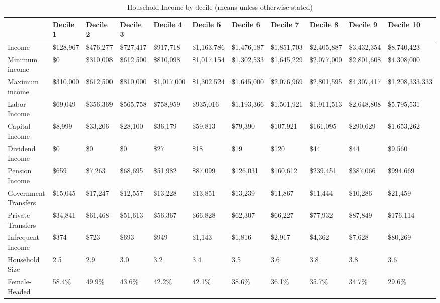 \documentclass[12pt]{article}
\begin{document}
\begin{landscape}

\begin{table}[]
\caption{Household Income by decile (means unless otherwise stated)}
\label{table:ydecile}
\footnotesize
\begin{tabular}{lllllllllll} \hline
& Decile 1                              & Decile 2  & Decile 3  & Decile 4  & Decile 5    & Decile 6    & Decile 7    & Decile 8    & Decile 9    & Decile 10                    \\ \hline
Income                           & \$128,967 & \$476,277 & \$727,417 & \$917,718   & \$1,163,786 & \$1,476,187 & \$1,851,703 & \$2,405,887 & \$3,432,354 & \$8,740,423     \\
Minimum income                        & \$0       & \$310,008 & \$612,500 & \$810,098   & \$1,017,154 & \$1,302,533 & \$1,645,229 & \$2,077,000 & \$2,801,608 & \$4,308,000     \\
Maximum income                        & \$310,000 & \$612,500 & \$810,000 & \$1,017,000 & \$1,302,524 & \$1,645,000 & \$2,076,969 & \$2,801,595 & \$4,307,417 & \$1,208,333,333 \\
Labor Income                     & \$69,049  & \$356,369 & \$565,758 & \$758,959   & \$935,016   & \$1,193,366 & \$1,501,921 & \$1,911,513 & \$2,648,808 & \$5,795,531     \\
Capital Income                   & \$8,999   & \$33,206  & \$28,100  & \$36,179    & \$59,813    & \$79,390    & \$107,921   & \$161,095   & \$290,629   & \$1,653,262     \\
Dividend Income                  & \$0       & \$0       & \$0       & \$27        & \$18        & \$19        & \$120       & \$44        & \$44        & \$9,560         \\
Pension Income                   & \$659     & \$7,263   & \$68,695  & \$51,982    & \$87,099    & \$126,031   & \$160,612   & \$239,451   & \$387,066   & \$994,669       \\
Government Transfers & \$15,045  & \$17,247  & \$12,557  & \$13,228    & \$13,851    & \$13,239    & \$11,867    & \$11,444    & \$10,286    & \$21,459        \\
Private Transfers    & \$34,841  & \$61,468  & \$51,613  & \$56,367    & \$66,828    & \$62,307    & \$66,227    & \$77,932    & \$87,849    & \$176,114       \\
Infrequent Income                & \$374     & \$723     & \$693     & \$949       & \$1,143     & \$1,816     & \$2,917     & \$4,362     & \$7,628     & \$80,269        \\
Household Size                   & 2.5       & 2.9       & 3.0       & 3.2         & 3.4         & 3.5         & 3.6         & 3.8         & 3.8         & 3.6             \\
Female-Headed              & 58.4\%    & 49.9\%    & 43.6\%    & 42.2\%      & 42.1\%      & 38.6\%      & 36.1\%      & 35.7\%      & 34.7\%      & 29.6\%         \\ \hline
\end{tabular}
\end{table}


\end{landscape}
\end{document}

